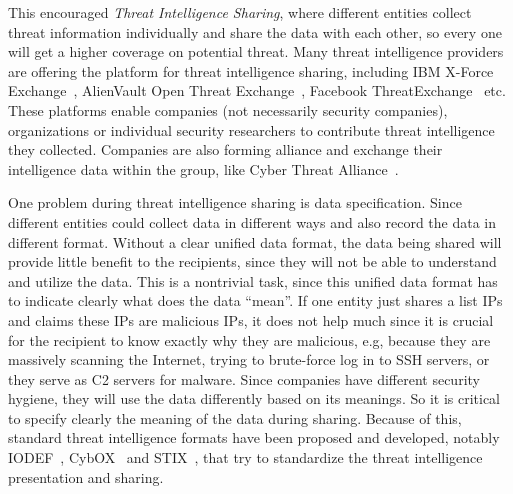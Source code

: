 This encouraged \textit{Threat Intelligence Sharing}, where different 
entities collect threat information individually and share the data
with each other, so every one will get a higher coverage on potential 
threat. Many threat intelligence providers are offering the platform
for threat intelligence sharing, including IBM X-Force 
Exchange~\cite{ibmxforce}, AlienVault Open Threat 
Exchange~\cite{alienvaultotx}, Facebook 
ThreatExchange~\cite{facebookthreatexchange} etc. These platforms
enable companies (not necessarily security companies), organizations 
or individual security researchers to contribute threat intelligence 
they collected. Companies are also forming alliance and exchange their
intelligence data within the group, like Cyber Threat
Alliance~\cite{cyberthreatalliance}.

One problem during threat intelligence sharing is data specification.
Since different entities could collect data in different ways and
also record the data in different format. Without a clear unified
data format, the data being shared will provide little benefit to
the recipients, since they will not be able to understand and utilize
the data. This is a nontrivial task, since this unified data format
has to indicate clearly what does the data ``mean''. If one entity
just shares a list IPs and claims these IPs are malicious IPs, it
does not help much since it is crucial for the recipient to know
exactly why they are malicious, e.g, because they are massively 
scanning the Internet, trying to brute-force log in to SSH servers,
or they serve as C2 servers for malware. Since companies have different 
security hygiene, they will use the data differently based on its
meanings. So it is critical to specify clearly the meaning of the
data during sharing. Because of this, standard threat intelligence 
formats have been proposed and developed, 
notably IODEF~\cite{IODEF}, CybOX~\cite{CybOX} and STIX~\cite{STIX}, 
that try to standardize the threat intelligence presentation and sharing. 


